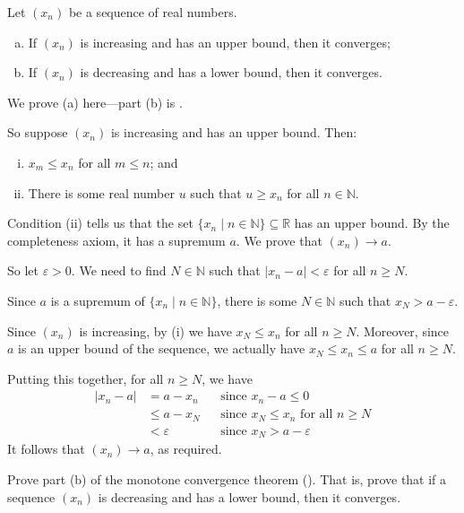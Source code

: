 \begin{theorem}
\label{thmMonotoneConvergence}
Let $(x_n)$ be a sequence of real numbers.
\begin{enumerate}[(a)]
\item If $(x_n)$ is increasing and has an upper bound, then it converges;
\item If $(x_n)$ is decreasing and has a lower bound, then it converges.
\end{enumerate}
\end{theorem}

\begin{cproof}[of (a)]
We prove (a) here---part (b) is .

So suppose $(x_n)$ is increasing and has an upper bound. Then:
\begin{enumerate}[(i)]
\item $x_m \le x_n$ for all $m \le n$; and
\item There is some real number $u$ such that $u \ge x_n$ for all $n \in \mathbb{N}$.
\end{enumerate}

Condition (ii) tells us that the set $\{ x_n \mid n \in \mathbb{N} \} \subseteq \mathbb{R}$ has an upper bound. By the completeness axiom, it has a supremum $a$. We prove that $(x_n) \to a$.

So let $\varepsilon > 0$. We need to find $N \in \mathbb{N}$ such that $|x_n - a| < \varepsilon$ for all $n \ge N$.

Since $a$ is a supremum of $\{ x_n \mid n \in \mathbb{N} \}$, there is some $N \in \mathbb{N}$ such that $x_N > a-\varepsilon$.

Since $(x_n)$ is increasing, by (i) we have $x_N \le x_n$ for all $n \ge N$. Moreover, since $a$ is an upper bound of the sequence, we actually have $x_N \le x_n \le a$ for all $n \ge N$.

Putting this together, for all $n \ge N$, we have
\begin{align*}
|x_n - a|
& = a-x_n && \text{since $x_n-a \le 0$} \\
& \le a-x_N && \text{since $x_N \le x_n$ for all $n \ge N$} \\
& < \varepsilon && \text{since $x_N > a-\varepsilon$}
\end{align*}
It follows that $(x_n) \to a$, as required.
\end{cproof}

\begin{exercise}
\label{exMonotoneConvergenceForDecreasingSequences}
Prove part (b) of the monotone convergence theorem (). That is, prove that if a sequence $(x_n)$ is decreasing and has a lower bound, then it converges.
\end{exercise}

